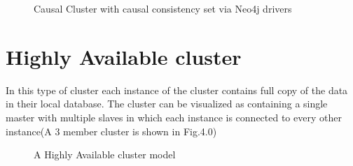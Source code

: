 \documentclass[9pt,twocolumn,twoside]{styles/osajnl}
\begin{document}
\begin{figure}[htbp]
\centering
{}
\caption{Causal Cluster with causal consistency set via Neo4j drivers ~\cite{www-neo4j-causal}}
\label{fig:false-color}
\end{figure}

\section{Highly Available cluster}
In this type of cluster each instance of the cluster contains full copy of the data in their local database. The cluster can be visualized as containing a single master with multiple slaves in which each instance is connected to every other instance(A 3 member cluster is shown in Fig.4.0)

\begin{figure}[htbp]
\centering
{}
\caption{A Highly Available cluster model~\cite{www-neo4j-ha}}
\label{fig:false-color}
\end{figure}
\end{document}
